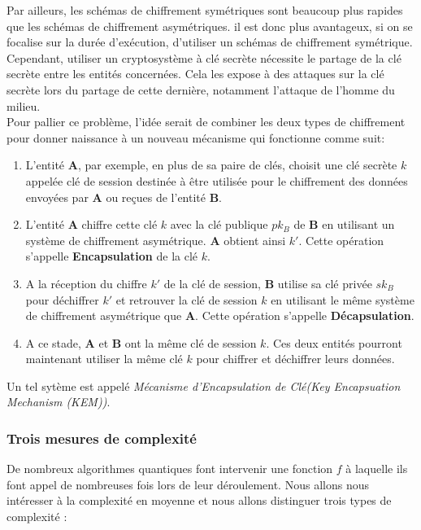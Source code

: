 \documentclass[12pt,openany]{report}
\begin{document}
Par ailleurs, les schémas de chiffrement symétriques sont beaucoup plus rapides que les schémas de chiffrement asymétriques. il est donc plus avantageux, si on se focalise sur la durée d'exécution, d'utiliser un schémas de chiffrement symétrique. Cependant, utiliser un cryptosystème à clé secrète nécessite le partage de la clé secrète entre les entités concernées. Cela les expose à des attaques sur la clé secrète lors du partage de cette dernière, notamment l'attaque de l'homme du milieu.\\
Pour pallier ce problème, l'idée serait de combiner les deux types de chiffrement pour donner naissance à un nouveau mécanisme qui fonctionne comme suit:
\begin{enumerate}

\item L'entité \textbf{A}, par exemple, en plus de sa paire de clés, choisit une clé secrète $k$ appelée clé de session destinée à être utilisée pour le chiffrement des données envoyées par \textbf{A} ou reçues de l'entité \textbf{B}.
\item L'entité \textbf{A} chiffre cette clé $k$ avec la clé publique $ pk_B $ de \textbf{B} en utilisant un système de chiffrement asymétrique. \textbf{A} obtient ainsi $k'$. Cette opération s'appelle \textbf{Encapsulation} de la clé $k$.
\item A la réception du chiffre $k'$ de la clé de session, \textbf{B} utilise sa clé privée $sk_B$ pour déchiffrer $k'$ et retrouver la clé de session $k$ en utilisant le même système de chiffrement asymétrique que \textbf{A}. Cette opération s'appelle \textbf{Décapsulation}.
\item A ce stade, \textbf{A} et \textbf{B} ont la même clé de session $k$. Ces deux entités pourront maintenant utiliser la même clé $k$ pour chiffrer et déchiffrer leurs données.\\

\end{enumerate}

Un tel sytème est appelé \textit{Mécanisme d'Encapsulation de Clé(Key Encapsuation Mechanism (KEM))}.


\subsubsection*{Trois mesures de complexité}
De nombreux algorithmes quantiques font intervenir une fonction $f$ à laquelle
ils font appel de nombreuses fois lors de leur déroulement. Nous allons nous
intéresser à la complexité en moyenne et nous allons distinguer trois types de
complexité :
\end{document}

